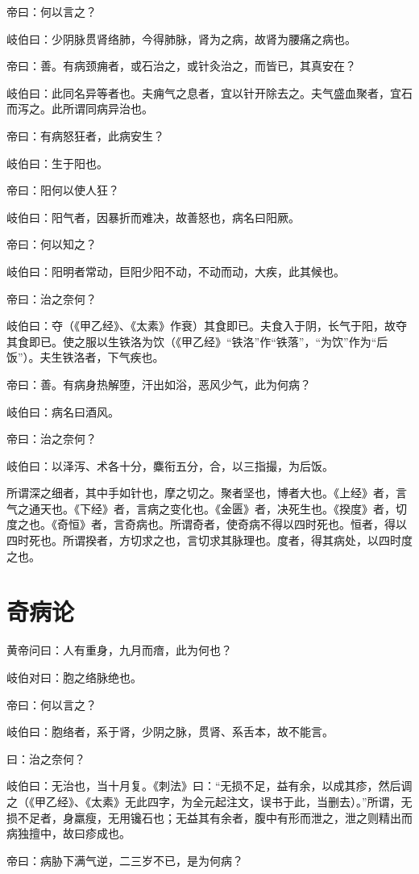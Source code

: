 \documentclass{article}%
\begin{document}
帝曰：何以言之？

岐伯曰：少阴脉贯肾络肺，今得肺脉，肾为之病，故肾为腰痛之病也。

帝曰：善。有病颈痈者，或石治之，或针灸治之，而皆已，其真安在？

岐伯曰：此同名异等者也。夫痈气之息者，宜以针开除去之。夫气盛血聚者，宜石而泻之。此所谓同病异治也。

帝曰：有病怒狂者，此病安生？

岐伯曰：生于阳也。

帝曰：阳何以使人狂？

岐伯曰：阳气者，因暴折而难决，故善怒也，病名曰阳厥。

帝曰：何以知之？

岐伯曰：阳明者常动，巨阳少阳不动，不动而动，大疾，此其候也。

帝曰：治之奈何？

岐伯曰：夺（《甲乙经》、《太素》作衰）其食即已。夫食入于阴，长气于阳，故夺其食即已。使之服以生铁洛为饮（《甲乙经》“铁洛”作“铁落”，“为饮”作为“后饭”）。夫生铁洛者，下气疾也。

帝曰：善。有病身热解堕，汗出如浴，恶风少气，此为何病？

岐伯曰：病名曰酒风。

帝曰：治之奈何？

岐伯曰：以泽泻、术各十分，麋衔五分，合，以三指撮，为后饭。

所谓深之细者，其中手如针也，摩之切之。聚者坚也，博者大也。《上经》者，言气之通天也。《下经》者，言病之变化也。《金匮》者，决死生也。《揆度》者，切度之也。《奇恒》者，言奇病也。所谓奇者，使奇病不得以四时死也。恒者，得以四时死也。所谓揆者，方切求之也，言切求其脉理也。度者，得其病处，以四时度之也。
\section{奇病论}
黄帝问曰：人有重身，九月而瘖，此为何也？

岐伯对曰：胞之络脉绝也。

帝曰：何以言之？

岐伯曰：胞络者，系于肾，少阴之脉，贯肾、系舌本，故不能言。

曰：治之奈何？

岐伯曰：无治也，当十月复。《刺法》曰：“无损不足，益有余，以成其疹，然后调之（《甲乙经》、《太素》无此四字，为全元起注文，误书于此，当删去）。”所谓，无损不足者，身羸瘦，无用镵石也；无益其有余者，腹中有形而泄之，泄之则精出而病独擅中，故曰疹成也。

帝曰：病胁下满气逆，二三岁不已，是为何病？
\end{document}
